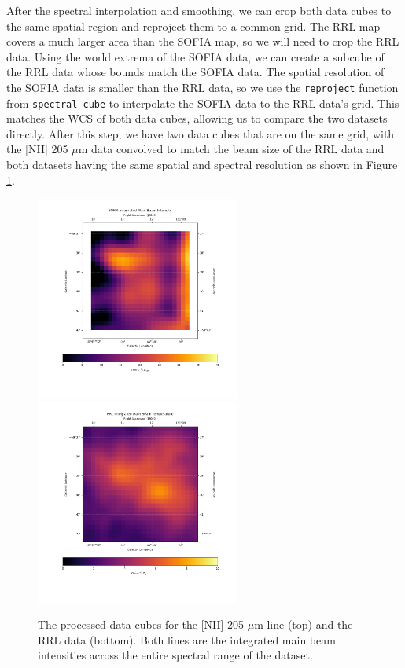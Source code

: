 After the spectral interpolation and smoothing, we can crop both data cubes to the same spatial region and reproject them to a common grid.
The RRL map covers a much larger area than the SOFIA map, so we will need to crop the RRL data.
Using the world extrema of the SOFIA data, we can create a subcube of the RRL data whose bounds match the SOFIA data.
The spatial resolution of the SOFIA data is smaller than the RRL data, so we use the \texttt{reproject} function from \texttt{spectral-cube} to interpolate the SOFIA data to the RRL data's grid.
This matches the WCS of both data cubes, allowing us to compare the two datasets directly.
After this step, we have two data cubes that are on the same grid, with the [NII] 205 $\mu$m data convolved to match the beam size of the RRL data and both datasets having the same spatial and spectral resolution as shown in Figure \ref{carina/fig:processed_data}.

\begin{figure}
    \centering
    \includegraphics[width=0.6\textwidth]{figs/carina/final_NII.png}
    \includegraphics[width=0.6\textwidth]{figs/carina/final_RRL.png}
    \caption[Preprocessed Data Cubes for {[}NII{]} and RRLs in Carina Nebula]{
        The processed data cubes for the [NII] 205 $\mu$m line (top) and the RRL data (bottom).
        Both lines are the integrated main beam intensities across the entire spectral range of the dataset.
        }
    \label{carina/fig:processed_data}
\end{figure}

